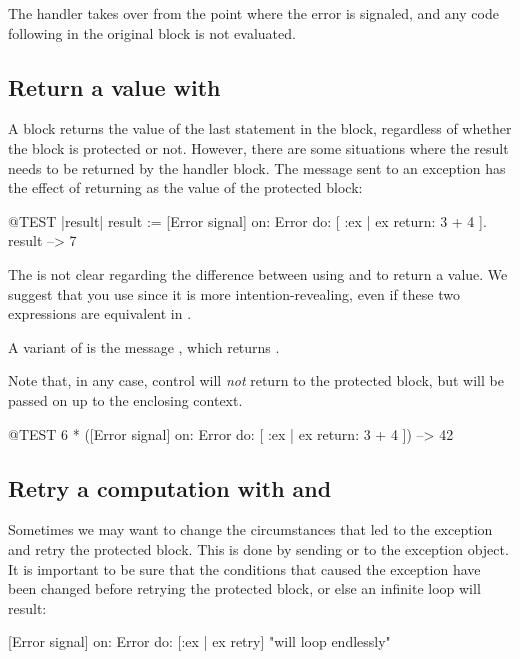 \documentclass[a4paper,10pt,twoside]{book}
\begin{document}
The handler takes over from the point where the error is signaled, and any code following in the original block is not evaluated.

\subsection{Return a value with }
A block returns the value of the last statement in the block, regardless of whether the block is protected or not. However, there are some situations where the result needs to be returned by the handler block. The message  sent to an exception has the effect of returning  as the value of the protected block:

\begin{code}{@TEST |result|}
result := [Error signal]
	on: Error
	do: [ :ex | ex return: 3 + 4 ].
result --> 7
\end{code}

The  is not clear regarding the difference between using  and  to return a value. We suggest that you use  since it is more intention-revealing, even if these two expressions are equivalent in \pharo.

A variant of  is the message , which returns . 

Note that, in any case, control will \emph{not} return to the protected block, but will be passed on up to the enclosing context.

\begin{code}{@TEST}
6 * ([Error signal] on: Error do: [ :ex | ex return: 3 + 4 ]) --> 42
\end{code}

\subsection{Retry a computation with  and }

Sometimes we may want to change the circumstances that led to the exception and retry the protected block. This is done by sending  or  to the exception object. It is important to be sure that the conditions that caused the exception have been changed before retrying the protected block, or else an infinite  loop will result:
\begin{code}{}
[Error signal] on: Error do: [:ex | ex retry]    "will loop endlessly"
\end{code}
\end{document}
